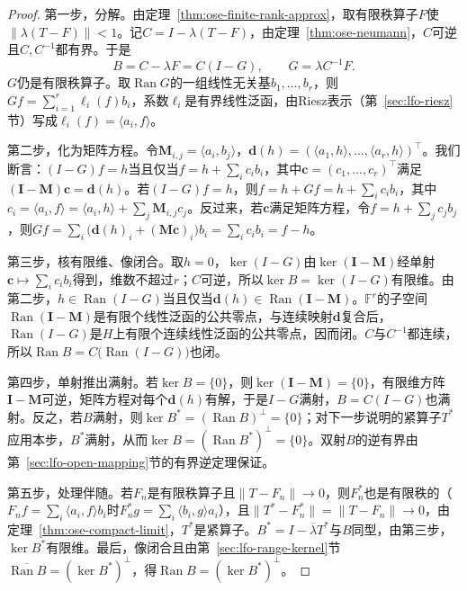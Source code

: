 \begin{proof}
第一步，分解。由定理~\ref{thm:ose-finite-rank-approx}，取有限秩算子$F$使$\|\lambda(T-F)\|<1$。记$C=I-\lambda(T-F)$，由定理~\ref{thm:ose-neumann}，$C$可逆且$C,C^{-1}$都有界。于是
\[
  B=C-\lambda F=C(I-G),\qquad G=\lambda C^{-1}F .
\]
$G$仍是有限秩算子。取$\operatorname{Ran}G$的一组线性无关基$b_1,\ldots,b_r$，则$Gf=\sum_{i=1}^r\ell_i(f)b_i$，系数$\ell_i$是有界线性泛函，由Riesz表示（第~\ref{sec:lfo-riesz}节）写成$\ell_i(f)=\langle a_i,f\rangle$。

第二步，化为矩阵方程。令$\bm M_{i,j}=\langle a_i,b_j\rangle$，$\bm d(h)=(\langle a_1,h\rangle,\ldots,\langle a_r,h\rangle)^\top$。我们断言：$(I-G)f=h$当且仅当$f=h+\sum_ic_ib_i$，其中$\bm c=(c_1,\ldots,c_r)^\top$满足$(\bm I-\bm M)\bm c=\bm d(h)$。若$(I-G)f=h$，则$f=h+Gf=h+\sum_ic_ib_i$，其中$c_i=\langle a_i,f\rangle=\langle a_i,h\rangle+\sum_j\bm M_{i,j}c_j$。反过来，若$\bm c$满足矩阵方程，令$f=h+\sum_jc_jb_j$，则$Gf=\sum_i\bigl(\bm d(h)_i+(\bm M\bm c)_i\bigr)b_i=\sum_ic_ib_i=f-h$。

第三步，核有限维、像闭合。取$h=0$，$\ker(I-G)$由$\ker(\bm I-\bm M)$经单射$\bm c\mapsto\sum_ic_ib_i$得到，维数不超过$r$；$C$可逆，所以$\ker B=\ker(I-G)$有限维。由第二步，$h\in\operatorname{Ran}(I-G)$当且仅当$\bm d(h)\in\operatorname{Ran}(\bm I-\bm M)$。$\mathbb F^r$的子空间$\operatorname{Ran}(\bm I-\bm M)$是有限个线性泛函的公共零点，与连续映射$\bm d$复合后，$\operatorname{Ran}(I-G)$是$H$上有限个连续线性泛函的公共零点，因而闭。$C$与$C^{-1}$都连续，所以$\operatorname{Ran}B=C\bigl(\operatorname{Ran}(I-G)\bigr)$也闭。

第四步，单射推出满射。若$\ker B=\{0\}$，则$\ker(\bm I-\bm M)=\{0\}$，有限维方阵$\bm I-\bm M$可逆，矩阵方程对每个$\bm d(h)$有解，于是$I-G$满射，$B=C(I-G)$也满射。反之，若$B$满射，则$\ker B^*=(\operatorname{Ran}B)^\perp=\{0\}$；对下一步说明的紧算子$T^*$应用本步，$B^*$满射，从而$\ker B=(\operatorname{Ran}B^*)^\perp=\{0\}$。双射$B$的逆有界由第~\ref{sec:lfo-open-mapping}节的有界逆定理保证。

第五步，处理伴随。若$F_n$是有限秩算子且$\|T-F_n\|\to0$，则$F_n^*$也是有限秩的（$F_nf=\sum_i\langle a_i,f\rangle b_i$时$F_n^*g=\sum_i\langle b_i,g\rangle a_i$），且$\|T^*-F_n^*\|=\|T-F_n\|\to0$，由定理~\ref{thm:ose-compact-limit}，$T^*$是紧算子。$B^*=I-\overline\lambda T^*$与$B$同型，由第三步，$\ker B^*$有限维。最后，像闭合且由第~\ref{sec:lfo-range-kernel}节$\overline{\operatorname{Ran}B}=(\ker B^*)^\perp$，得$\operatorname{Ran}B=(\ker B^*)^\perp$。
\end{proof}

